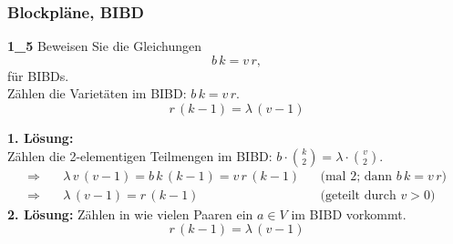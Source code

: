 \subsubsection*{Blockpläne, BIBD}

\begin{loesung}
\textbf{1\_5} Beweisen Sie die Gleichungen
\[ b\,k = v\,r, \]
für BIBDs.\\
Zählen die Varietäten im BIBD: \quad $b\,k = v\,r$.
\[ r\,(k-1) = \lambda\,(v-1) \]

\textbf{1. Lösung:}\\
Zählen die 2-elementigen Teilmengen im BIBD: \quad $b \cdot \binom{k}{2} = \lambda \cdot \binom{v}{2}$.
\begin{align*}
\Rightarrow\quad & \lambda\, v\,(v-1) = b\,k\,(k-1) = v\,r\,(k-1) && \text{(mal 2; dann } b\,k = v\,r\text{)}\\
\Rightarrow\quad & \lambda\,(v-1) = r\,(k-1) && \text{(geteilt durch } v > 0\text{)}
\end{align*}
\textbf{2. Lösung:} Zählen in wie vielen Paaren ein $a \in V$ im BIBD vorkommt.
\[ r\,(k-1) = \lambda\,(v-1) \]
\end{loesung}
